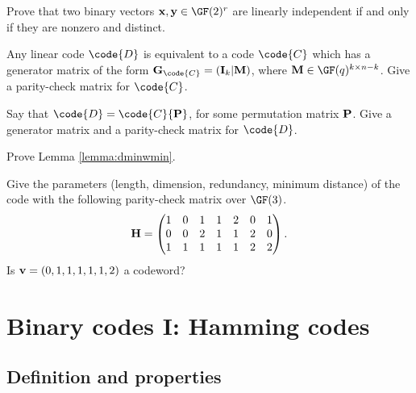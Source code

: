 \documentclass[a4paper, 11pt, openany]{book}
\begin{document}
\begin{exercise}
Prove that two binary vectors ${\bf x}, {\bf y} \in \GF(2)^r$ are linearly independent if and only if they are nonzero and distinct.
\end{exercise}




\begin{exercise} \label{q:GH}
Any linear code $\code{D}$ is equivalent to a code $\code{C}$ which has a generator matrix of the form ${\bf G}_\code{C} = ({\bf I}_k | {\bf M})$, where ${\bf M} \in \GF(q)^{k \times n-k}$. Give a parity-check matrix for $\code{C}$.

Say that $\code{D} = \code{C} {\bf P}$, for some permutation matrix ${\bf P}$. Give a generator matrix and a parity-check matrix for $\code{D}$.
\end{exercise}


\begin{exercise}
Prove Lemma \ref{lemma:dminwmin}.
\end{exercise}



\begin{exercise}
Give the parameters (length, dimension, redundancy, minimum distance) of the code with the following parity-check matrix over $\GF(3)$.
\[
	{\bf H} = \begin{pmatrix}
	1 & 0 & 1 & 1 & 2 & 0 & 1\\
	0 & 0 & 2 & 1 & 1 & 2 & 0\\
	1 & 1 & 1 & 1 & 1 & 2 & 2
	\end{pmatrix}.
\]
Is ${\bf v} = (0,1,1,1,1,1,2)$ a codeword?
\end{exercise}



\section{Binary codes I: Hamming codes}
\label{sec:24}



\subsection{Definition and properties}

\end{document}
